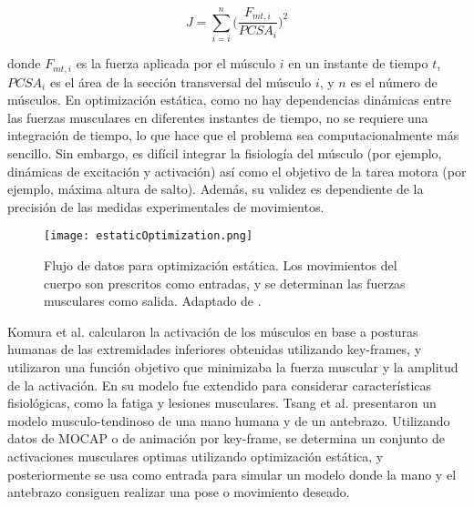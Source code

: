 \begin{equation}
	J = \sum_{i=i}^n \bigg( \frac{F_{mt,i}}{PCSA_i} \bigg)^2
\end{equation}

donde $F_{mt,i}$ es la fuerza aplicada por el músculo $i$ en un instante de tiempo $t$, $PCSA_i$ es el área de la sección transversal del músculo $i$, y $n$ es el número de músculos. En optimización estática, como no hay dependencias dinámicas entre las fuerzas musculares en diferentes instantes de tiempo, no se requiere una integración de tiempo, lo que hace que el problema sea computacionalmente más sencillo. Sin embargo, es difícil integrar la fisiología del músculo (por ejemplo, dinámicas de excitación y activación) así como el objetivo de la tarea motora (por ejemplo, máxima altura de salto). Además, su validez es dependiente de la precisión de las medidas experimentales de movimientos.

\begin{figure}
	\centering
		\texttt{[image: estaticOptimization.png]}
	\caption[Flujo de datos para optimización estática.]{Flujo de datos para optimización estática. Los movimientos del cuerpo son prescritos como entradas, y se determinan las fuerzas musculares como salida. Adaptado de \citep{kutz2004standard}.}
		\label{fig:estaticOptimization}
\end{figure}

Komura et al. \citep{komura1997muscle, komura2000creating} calcularon la activación de los músculos en base a posturas humanas de las extremidades inferiores obtenidas utilizando key-frames, y utilizaron una función objetivo que minimizaba la fuerza muscular y la amplitud de la activación. En \citep{komura2000creating} su modelo fue extendido para considerar características fisiológicas, como la fatiga y lesiones musculares. Tsang et al. \citep{tsang2005helping} presentaron un modelo musculo-tendinoso de una mano humana y de un antebrazo. Utilizando datos de MOCAP o de animación por key-frame, se determina un conjunto de activaciones musculares optimas utilizando optimización estática, y posteriormente se usa como entrada para simular un modelo donde la mano y el antebrazo consiguen realizar una pose o movimiento deseado. 

